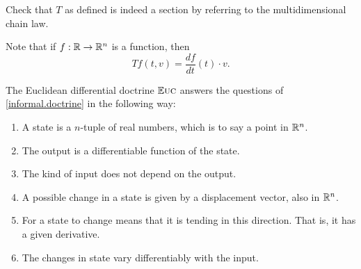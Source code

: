 \documentclass[DynamicalBook]{subfiles}
\begin{document}
\begin{exercise}
Check that $T$ as defined is indeed a section by referring to the
multidimensional chain law.
\end{exercise}
\begin{remark}
Note that if $f : \mathbb{R} \to \mathbb{R}^n$ is a function, then 
$$Tf(t, v) = \frac{df}{dt}(t) \cdot v.$$
\end{remark}

The Euclidean differential doctrine $\mathbb{E}\textsc{uc}$ answers the questions of
\cref{informal.doctrine} in the following way:
\begin{enumerate}
  \item A state is a $n$-tuple of real numbers, which is to say a point in $\mathbb{R}^n$.
  \item The output is a differentiable function of the state.
  \item The kind of input does not depend on the output.
  \item A possible change in a state is given by a displacement vector, also in $\mathbb{R}^n$.
  \item For a state to change means that it is tending in this direction. That
    is, it has a given derivative.
  \item The changes in state vary differentiably with the input.
\end{enumerate}
\end{document}
